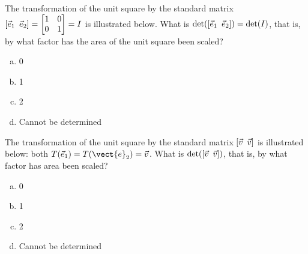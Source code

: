 \begin{applicationActivities}
\begin{activity}{2}
The transformation of the unit square by the
standard matrix \([\vec{e}_1\hspace{0.5em} \vec{e}_2]=\begin{bmatrix}1&0\\0&1\end{bmatrix}=I\) is illustrated below.
What is $\det([\vec{e}_1\hspace{0.5em} \vec{e}_2])=\det(I)$, that is, by what
factor has the area of the unit square been scaled?
\begin{center}
\end{center}
  \begin{enumerate}[a)]
    \item 0
    \item 1
    \item 2
    \item Cannot be determined
  \end{enumerate}
\end{activity}

\begin{activity}{2}
The transformation of the unit square by the
standard matrix \([\vec{v}\hspace{0.5em} \vec{v}]\) is illustrated below: both
\(T(\vec{e}_1)=T(\vect{e}_2)=\vec{v}\).
What is \(\det([\vec{v}\hspace{0.5em} \vec{v}])\), that is, by what factor has
area been scaled?
\begin{center}
\end{center}
  \begin{enumerate}[a)]
    \item 0
    \item 1
    \item 2
    \item Cannot be determined
  \end{enumerate}
\end{activity}



\end{applicationActivities}
